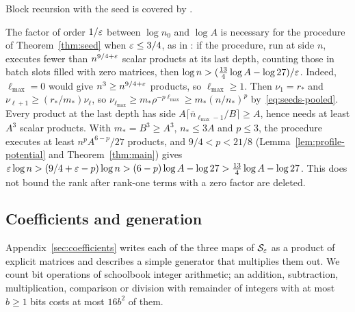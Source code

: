 Block recursion with the seed is covered by \citep[Lemma~9.4 and
Propositions~9.5--9.6]{FinCon26}.

\begin{remark}\label{rem:seed-factor}
The factor of order \(1/\varepsilon\) between \(\log n_0\) and \(\log A\) is
necessary for the procedure of Theorem~\ref{thm:seed} when
\(\varepsilon\le3/4\), as in \citep[Remark~8.8]{FinCon26}: if the procedure,
run at side \(n\), executes fewer than \(n^{9/4+\varepsilon}\) scalar products
at its last depth, counting those in batch slots filled with zero
matrices, then \(\log n>(\frac{13}4\log A-\log27)/\varepsilon\). Indeed,
\(\ell_{\max}=0\) would give \(n^3\ge n^{9/4+\varepsilon}\) products, so
\(\ell_{\max}\ge1\). Then \(\nu_1=r_*\) and
\(\nu_{\ell+1}\ge(r_*/m_*)\nu_\ell\), so
\(\nu_{\ell_{\max}}\ge m_*\rho^{-p\ell_{\max}}\ge m_*(n/n_*)^p\)
by~\eqref{eq:seeds-pooled}. Every product at the last depth has side
\(A\lceil\bar n_{\ell_{\max}-1}/B\rceil\ge A\), hence needs at least
\(A^3\) scalar products. With \(m_*=B^3\ge A^3\), \(n_*\le3A\) and
\(p\le3\), the procedure executes at least \(n^pA^{6-p}/27\) products,
and \(9/4<p<21/8\) (Lemma~\ref{lem:profile-potential} and
Theorem~\ref{thm:main}) gives
\(\varepsilon\log n>(9/4+\varepsilon-p)\log n>(6-p)\log A-\log27
>\frac{13}4\log A-\log27\). This does not bound the rank after rank-one
terms with a zero factor are deleted.
\end{remark}

\subsection{Coefficients and generation}
\label{sec:seeds-coefficients}

Appendix~\ref{sec:coefficients} writes each of the three maps of
\(\mathcal S_\varepsilon\) as a product of explicit matrices and describes a
simple generator that multiplies them out. We count bit operations of
schoolbook integer arithmetic; an addition, subtraction, multiplication,
comparison or division with remainder of integers with at most
\(b\ge1\) bits costs at most \(16b^2\) of them.

